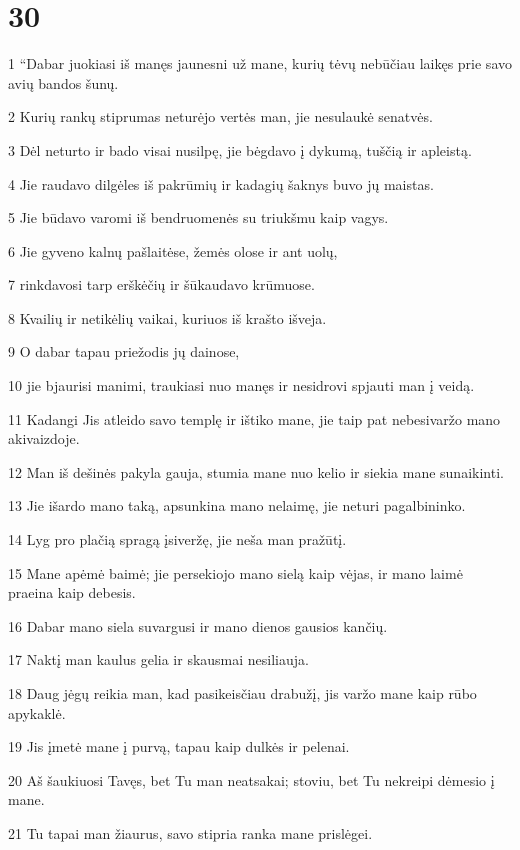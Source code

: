 \chapter{30}


\par 1 “Dabar juokiasi iš manęs jaunesni už mane, kurių tėvų nebūčiau laikęs prie savo avių bandos šunų. 
\par 2 Kurių rankų stiprumas neturėjo vertės man, jie nesulaukė senatvės. 
\par 3 Dėl neturto ir bado visai nusilpę, jie bėgdavo į dykumą, tuščią ir apleistą. 
\par 4 Jie raudavo dilgėles iš pakrūmių ir kadagių šaknys buvo jų maistas. 
\par 5 Jie būdavo varomi iš bendruomenės su triukšmu kaip vagys. 
\par 6 Jie gyveno kalnų pašlaitėse, žemės olose ir ant uolų, 
\par 7 rinkdavosi tarp erškėčių ir šūkaudavo krūmuose. 
\par 8 Kvailių ir netikėlių vaikai, kuriuos iš krašto išveja. 
\par 9 O dabar tapau priežodis jų dainose, 
\par 10 jie bjaurisi manimi, traukiasi nuo manęs ir nesidrovi spjauti man į veidą. 
\par 11 Kadangi Jis atleido savo templę ir ištiko mane, jie taip pat nebesivaržo mano akivaizdoje. 
\par 12 Man iš dešinės pakyla gauja, stumia mane nuo kelio ir siekia mane sunaikinti. 
\par 13 Jie išardo mano taką, apsunkina mano nelaimę, jie neturi pagalbininko. 
\par 14 Lyg pro plačią spragą įsiveržę, jie neša man pražūtį. 
\par 15 Mane apėmė baimė; jie persekiojo mano sielą kaip vėjas, ir mano laimė praeina kaip debesis. 
\par 16 Dabar mano siela suvargusi ir mano dienos gausios kančių. 
\par 17 Naktį man kaulus gelia ir skausmai nesiliauja. 
\par 18 Daug jėgų reikia man, kad pasikeisčiau drabužį, jis varžo mane kaip rūbo apykaklė. 
\par 19 Jis įmetė mane į purvą, tapau kaip dulkės ir pelenai. 
\par 20 Aš šaukiuosi Tavęs, bet Tu man neatsakai; stoviu, bet Tu nekreipi dėmesio į mane. 
\par 21 Tu tapai man žiaurus, savo stipria ranka mane prislėgei. 
